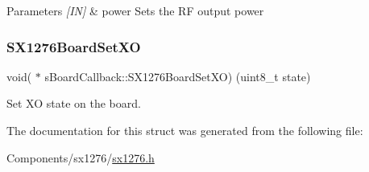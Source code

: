 \begin{DoxyParams}{Parameters}
{\em \mbox{[}\+I\+N\mbox{]}} & power Sets the RF output power \\
\hline
\end{DoxyParams}
\mbox{\label{structsBoardCallback_ae6be070dbcbbcdb0f30d087e6152dd55}} 
\subsubsection{\texorpdfstring{S\+X1276\+Board\+Set\+XO}{SX1276BoardSetXO}}
{\footnotesize\ttfamily void( $\ast$ s\+Board\+Callback\+::\+S\+X1276\+Board\+Set\+XO) (uint8\+\_\+t state)}



Set XO state on the board. 



The documentation for this struct was generated from the following file\+:\begin{DoxyCompactItemize}
\item 
Components/sx1276/\hyperlink{sx1276_8h}{sx1276.\+h}\end{DoxyCompactItemize}
